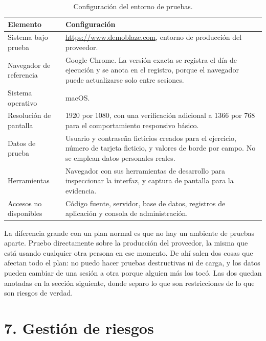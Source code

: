 \documentclass[11pt,a4paper]{article}
\begin{document}
\begingroup
\small
\renewcommand{\arraystretch}{1.2}
\begin{table}[htb]\centering\small
\caption{Configuración del entorno de pruebas.}\label{tab:entorno}
\begin{tabularx}{\textwidth}{@{}L{4.2cm} Y@{}}
\toprule
\textbf{Elemento} & \textbf{Configuración} \\
\midrule
Sistema bajo prueba & \url{https://www.demoblaze.com}, entorno de producción del proveedor. \\
Navegador de referencia & Google Chrome. La versión exacta se registra el día de ejecución y se anota en el registro, porque el navegador puede actualizarse solo entre sesiones. \\
Sistema operativo & macOS. \\
Resolución de pantalla & 1920 por 1080, con una verificación adicional a 1366 por 768 para el comportamiento responsivo básico. \\
Datos de prueba & Usuario y contraseña ficticios creados para el ejercicio, número de tarjeta ficticio, y valores de borde por campo. No se emplean datos personales reales. \\
Herramientas & Navegador con sus herramientas de desarrollo para inspeccionar la interfaz, y captura de pantalla para la evidencia. \\
Accesos no disponibles & Código fuente, servidor, base de datos, registros de aplicación y consola de administración. \\
\bottomrule
\end{tabularx}
\end{table}
\endgroup

La diferencia grande con un plan normal es que no hay un ambiente de pruebas aparte.
Pruebo directamente sobre la producción del proveedor, la misma que está usando
cualquier otra persona en ese momento. De ahí salen dos cosas que afectan todo el
plan: no puedo hacer pruebas destructivas ni de carga, y los datos pueden cambiar de
una sesión a otra porque alguien más los tocó. Las dos quedan anotadas en la sección
siguiente, donde separo lo que son restricciones de lo que son riesgos de verdad.

\FloatBarrier
\section*{7. Gestión de riesgos}
\end{document}
